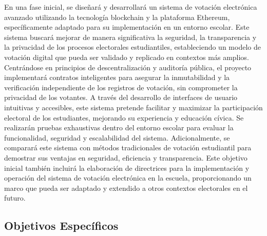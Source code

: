 \documentclass{report}
\begin{document}
	En una fase inicial, se diseñará y desarrollará un sistema de votación electrónica avanzado utilizando la tecnología blockchain y la plataforma Ethereum, específicamente adaptado para su implementación en un entorno escolar. Este sistema buscará mejorar de manera significativa la seguridad, la transparencia y la privacidad de los procesos electorales estudiantiles, estableciendo un modelo de votación digital que pueda ser validado y replicado en contextos más amplios. Centrándose en principios de descentralización y auditoría pública, el proyecto implementará contratos inteligentes para asegurar la inmutabilidad y la verificación independiente de los registros de votación, sin comprometer la privacidad de los votantes. A través del desarrollo de interfaces de usuario intuitivas y accesibles, este sistema pretende facilitar y maximizar la participación electoral de los estudiantes, mejorando su experiencia y educación cívica. Se realizarán pruebas exhaustivas dentro del entorno escolar para evaluar la funcionalidad, seguridad y escalabilidad del sistema. Adicionalmente, se comparará este sistema con métodos tradicionales de votación estudiantil para demostrar sus ventajas en seguridad, eficiencia y transparencia. Este objetivo inicial también incluirá la elaboración de directrices para la implementación y operación del sistema de votación electrónica en la escuela, proporcionando un marco que pueda ser adaptado y extendido a otros contextos electorales en el futuro.
	
	\subsection{Objetivos Específicos}
	
\end{document}
